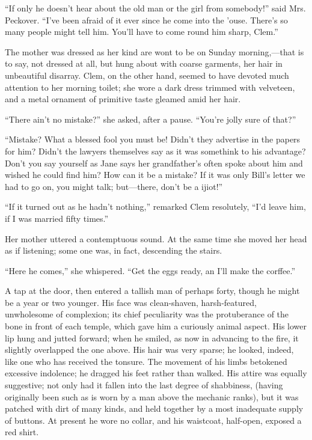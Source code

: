 ``If only he doesn't hear about the old man or the girl from somebody!''
said Mrs. Peckover. ``I've been afraid of it ever since he come into the
'ouse. There's so many people might tell him. You'll have to come round
him sharp, Clem.''

The mother was dressed as her kind are wont to be on Sunday
morning,---that is to say, not dressed at all, but hung about with
coarse garments, her hair in unbeautiful disarray. Clem, on the other
hand, seemed to have devoted much attention to her morning toilet; she
wore a dark dress trimmed with {}velveteen, and a metal ornament of
primitive taste gleamed amid her hair.

``There ain't no mistake?'' she asked, after a pause. ``You're jolly
sure of that?''

``Mistake? What a blessed fool you must be! Didn't they advertise in the
papers for him? Didn't the lawyers themselves say as it was somethink to
his advantage? Don't you say yourself as Jane says her grandfather's
often spoke about him and wished he could find him? How can it be a
mistake? If it was only Bill's letter we had to go on, you might talk;
but---there, don't be a ijiot!''

``If it turned out as he hadn't nothing,'' remarked Clem resolutely,
``I'd leave him, if I was married fifty times.''

Her mother uttered a contemptuous sound. At the same time she moved her
head as if listening; some one was, in fact, descending the stairs.

``Here he comes,'' she whispered. ``Get the eggs ready, an I'll make the
corffee.''

A tap at the door, then entered a tallish {}man of perhaps forty, though
he might be a year or two younger. His face was clean-shaven,
harsh-featured, unwholesome of complexion; its chief peculiarity was the
protuberance of the bone in front of each temple, which gave him a
curiously animal aspect. His lower lip hung and jutted forward; when he
smiled, as now in advancing to the fire, it slightly overlapped the one
above. His hair was very sparse; he looked, indeed, like one who has
received the tonsure. The movement of his limbs betokened excessive
indolence; he dragged his feet rather than walked. His attire was
equally suggestive; not only had it fallen into the last degree of
shabbiness, (having originally been such as is worn by a man above the
mechanic ranks), but it was patched with dirt of many kinds, and held
together by a most inadequate supply of buttons. At present he wore no
collar, and his waistcoat, half-open, exposed a red shirt.

